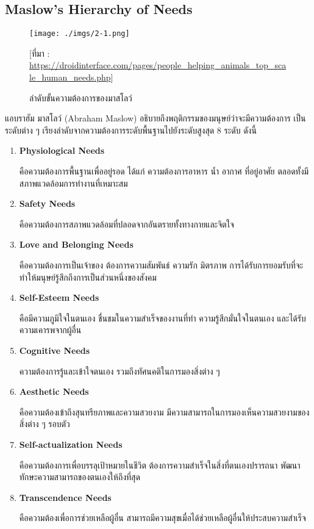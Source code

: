 \documentclass[12pt,oneside,openright,a4paper]{cpe-thai-project}
\begin{document}
\pagebreak
\subsection{Maslow’s Hierarchy of Needs \cite{maslow15}}

\begin{figure}[!h]\centering
\texttt{[image: ./imgs/2-1.png]}
\caption{ลำดับขั้นความต้องการของมาสโลว์}\label{fig:2-1}
\small [ที่มา : \url{https://droidinterface.com/pages/people_helping_animals_top_scale_human_needs.php}]
\end{figure}

แอบราฮัม มาสโลว์ (Abraham Maslow) อธิบายถึงพฤติกรรมของมนุษย์ว่าจะมีความต้องการ
เป็นระดับต่าง ๆ เรียงลำดับจากความต้องการระดับพื้นฐานไปยังระดับสูงสุด 8 ระดับ ดังนี้

\begin{enumerate}
  \item \textbf{Physiological Needs}
  
    คือความต้องการพื้นฐานเพื่ออยู่รอด ได้แก่ ความต้องการอาหาร น้ำ อากาศ 
  ที่อยู่อาศัย ตลอดทั้งมีสภาพแวดล้อมการทำงานที่เหมาะสม

  \item \textbf{Safety Needs}
  
    คือความต้องการสภาพแวดล้อมที่ปลอดจากอันตรายทั้งทางกายและจิตใจ

  \item \textbf{Love and Belonging Needs}
  
    คือความต้องการเป็นเจ้าของ ต้องการความสัมพันธ์ ความรัก มิตรภาพ 
    การได้รับการยอมรับที่จะทำให้มนุษย์รู้สึกถึงการเป็นส่วนหนึ่งของสังคม

  \item \textbf{Self-Esteem Needs}
  
    คือมีความภูมิใจในตนเอง ชื่นชมในความสำเร็จของงานที่ทำ 
    ความรู้สึกมั่นใจในตนเอง และได้รับความเคารพจากผู้อื่น

  \item \textbf{Cognitive Needs}
  
    ความต้องการรู้และเข้าใจตนเอง รวมถึงทัศนคติในการมองสิ่งต่าง ๆ

  \item \textbf{Aesthetic Needs}
  
    คือความต้องเข้าถึงสุนทรียภาพและความสวยงาม 
    มีความสามารถในการมองเห็นความสวยงามของสิ่งต่าง ๆ รอบตัว

  \item \textbf{Self-actualization Needs}
  
    คือความต้องการเพื่อบรรลุเป้าหมายในชีวิต ต้องการความสำเร็จในสิ่งที่ตนเองปรารถนา 
    พัฒนาทักษะความสามารถของตนเองให้ถึงที่สุด

  \item \textbf{Transcendence Needs}
  
    คือความต้องเพื่อการช่วยเหลือผู้อื่น สามารถมีความสุขเมื่อได้ช่วยเหลือผู้อื่นให้ประสบความสำเร็จ
\end{enumerate}
\end{document}

